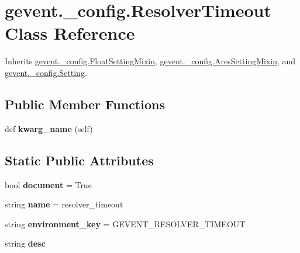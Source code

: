 \hypertarget{classgevent_1_1__config_1_1_resolver_timeout}{}\section{gevent.\+\_\+config.\+Resolver\+Timeout Class Reference}
\label{classgevent_1_1__config_1_1_resolver_timeout}


Inherits \hyperlink{classgevent_1_1__config_1_1_float_setting_mixin}{gevent.\+\_\+config.\+Float\+Setting\+Mixin}, \hyperlink{classgevent_1_1__config_1_1_ares_setting_mixin}{gevent.\+\_\+config.\+Ares\+Setting\+Mixin}, and \hyperlink{classgevent_1_1__config_1_1_setting}{gevent.\+\_\+config.\+Setting}.

\subsection*{Public Member Functions}
\begin{DoxyCompactItemize}
\item 
\mbox{\label{classgevent_1_1__config_1_1_resolver_timeout_a22eec98d484ddf8eb6f61f02b02a8bdf}} 
def {\bfseries kwarg\+\_\+name} (self)
\end{DoxyCompactItemize}
\subsection*{Static Public Attributes}
\begin{DoxyCompactItemize}
\item 
\mbox{\label{classgevent_1_1__config_1_1_resolver_timeout_aa2aa330bdf40a57b86102330883be956}} 
bool {\bfseries document} = True
\item 
\mbox{\label{classgevent_1_1__config_1_1_resolver_timeout_a86a4e4dc5e14090ef76910f91662727c}} 
string {\bfseries name} = \textquotesingle{}resolver\+\_\+timeout\textquotesingle{}
\item 
\mbox{\label{classgevent_1_1__config_1_1_resolver_timeout_a88f66da76d74157db5fedd00f2ddbb11}} 
string {\bfseries environment\+\_\+key} = \textquotesingle{}G\+E\+V\+E\+N\+T\+\_\+\+R\+E\+S\+O\+L\+V\+E\+R\+\_\+\+T\+I\+M\+E\+O\+UT\textquotesingle{}
\item 
string {\bfseries desc}
\end{DoxyCompactItemize}



